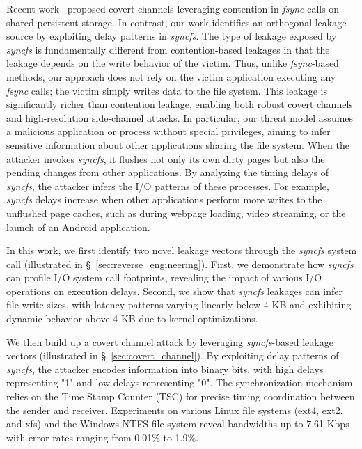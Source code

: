Recent work~\cite{chen2023sync+, jiang2024sync+} proposed covert channels leveraging contention in \textit{fsync} calls on shared persistent storage. In contrast, our work identifies an orthogonal leakage source by exploiting delay patterns in \textit{syncfs}.  The type of leakage exposed by \textit{syncfs} is fundamentally different from contention-based leakages in that the leakage depends on the write behavior of the victim. 
Thus, unlike \textit{fsync}-based methods, our approach does not rely on the victim application executing any \textit{fsync} calls; the victim simply writes data to the file system.  This leakage is significantly richer than contention leakage, enabling both robust covert channels and high-resolution side-channel attacks. In particular, our threat model assumes a malicious application or process without special privileges, aiming to infer sensitive information about other applications sharing the file system. When the attacker invokes \textit{syncfs}, it flushes not only 
its own dirty pages but also the pending changes from other applications. By analyzing the timing delays of \textit{syncfs}, the attacker infers the I/O patterns of these processes. For example, \textit{syncfs} delays increase when other applications perform more writes to the unflushed page caches, such as during webpage loading, video streaming, or the launch of an Android application.


In this work, we first identify two novel leakage vectors through the \textit{syncfs} system call (illustrated in §~\ref{sec:reverse_engineering}). First, we demonstrate how \textit{syncfs} can profile I/O system call footprints, revealing the impact of various I/O operations on execution delays. Second, we show that \textit{syncfs} leakages can infer file write sizes, with latency patterns varying linearly below 4 KB and exhibiting dynamic behavior above 4 KB due to kernel optimizations. 

We then build up a covert channel attack by leveraging \textit{syncfs}-based leakage vectors (illustrated in §~\ref{sec:covert_channel}). By exploiting delay patterns of \textit{syncfs}, the attacker encodes information into binary bits, with high delays representing "1" and low delays representing "0". The synchronization mechanism relies on the Time Stamp Counter (TSC) for precise timing coordination between the sender and receiver. Experiments on various Linux file systems (\eg ext4, ext2. and xfs) and the Windows NTFS file system reveal bandwidths up to 7.61 Kbps with error rates ranging from 0.01\% to 1.9\%.


